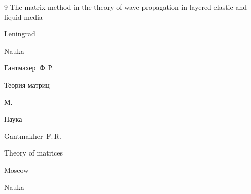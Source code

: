 \begin{thebibliography}{9}
\book The matrix method in the theory of wave propagation in layered elastic and liquid media 

\publaddr Leningrad

\publ Nauka






\by Гантмахер~Ф.\,Р.

\book Теория матриц

\publaddr М.

\publ Наука



\misctransl

\by Gantmakher~F.\,R.

\book Theory of matrices

\publaddr Moscow

\publ Nauka





\end{thebibliography}





\hskip6.5cm \thedate \par

\hskip6.5cm\therevdate\par








\makeengtitlem





\newpage



%

%
